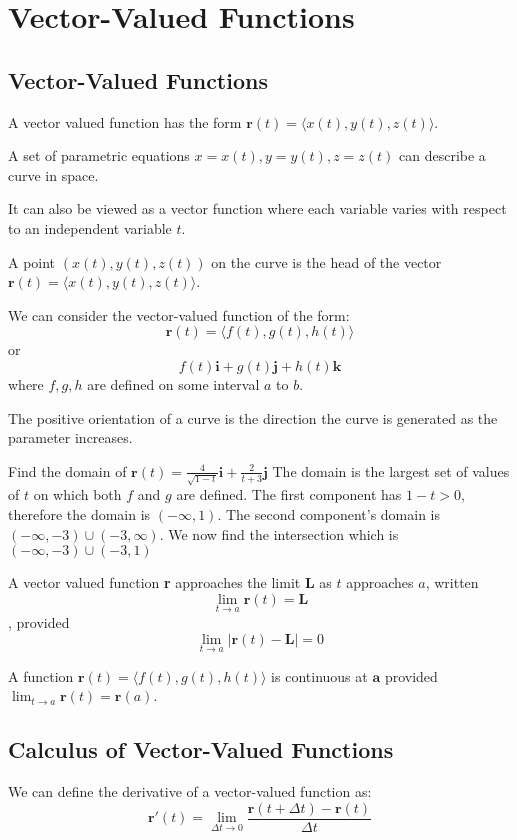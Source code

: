 \documentclass[../calc3.tex]{subfiles}
\begin{document}
\chapter{Vector-Valued Functions}
\section{Vector-Valued Functions}
A vector valued function has the form $\textbf{r}(t)=\langle x(t),y(t),z(t)\rangle$.

A set of parametric equations $x=x(t), y=y(t), z=z(t)$ can describe a curve in space.

It can also be viewed as a vector function where each variable varies with respect to an independent variable $t$. 

A point $(x(t),y(t),z(t))$ on the curve is the head of the vector $\textbf{r}(t)=\langle x(t),y(t),z(t)\rangle$.

We can consider the vector-valued function of the form: 
\[\textbf{r}(t)=\langle f(t),g(t),h(t)\rangle\]
or
\[f(t)\textbf{i}+g(t)\textbf{j}+h(t)\textbf{k}\]
where $f,g,h$ are defined on some interval $a$ to $b$.

The positive orientation of a curve is the direction the curve  is generated as the parameter increases.

\begin{example}
    Find the domain of $\textbf{r}(t)=\frac{4}{\sqrt{1-t}}\textbf{i}+\frac{2}{t+3}\textbf{j}$
    \smallbreak
    The domain is the largest set of values of $t$ on which both $f$ and $g$ are defined.
    \smallbreak
    The first component has $1-t>0$, therefore the domain is $(-\infty,1)$.
    \smallbreak
    The second component's domain is $(-\infty,-3)\cup(-3,\infty)$.
    \smallbreak
    We now find the intersection which is $(-\infty,-3)\cup(-3,1)$ 
\end{example}

\begin{definition}
    A vector valued function \textbf{r} approaches the limit \textbf{L} as $t$ approaches $a$, 
    written \[\lim_{t\to a}\textbf{r}(t)=\textbf{L}\], provided \[\lim_{t\to a}|\textbf{r}(t)-\textbf{L}|=0\]
\end{definition}

A function $\textbf{r}(t)=\langle f(t),g(t),h(t)\rangle$ is continuous at $\textbf{a}$ 
provided $\lim_{t\to a}\textbf{r}(t)=\textbf{r}(a)$.

\section{Calculus of Vector-Valued Functions}
We can define the derivative of a vector-valued function as:
\[\textbf{r}'(t)=\lim_{\Delta t\to 0}\frac{\textbf{r}(t+\Delta t)-\textbf{r}(t)}{\Delta t}\]
\end{document}
